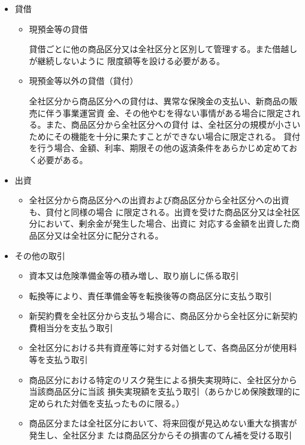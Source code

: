 \documentclass[report,gutter=10mm,fore-edge=10mm,uplatex,dvipdfmx]{jlreq}
\begin{document}
\begin{itemize}
\item[] 貸借
\begin{itemize}
\item[] 現預金等の貸借\par
貸借ごとに他の商品区分又は全社区分と区別して管理する。また借越しが継続しないように
限度額等を設ける必要がある。
\item[] 現預金等以外の貸借（貸付）\par
全社区分から商品区分への貸付は、異常な保険金の支払い、新商品の販売に伴う事業運営資
金、その他やむを得ない事情がある場合に限定される。また、商品区分から全社区分への貸付
は、全社区分の規模が小さいためにその機能を十分に果たすことができない場合に限定される。
貸付を行う場合、金額、利率、期限その他の返済条件をあらかじめ定めておく必要がある。
\end{itemize}
\item[] 出資
\begin{itemize}
\item[] 全社区分から商品区分への出資および商品区分から全社区分への出資も、貸付と同様の場合
 に限定される。出資を受けた商品区分又は全社区分において、剰余金が発生した場合、出資に
対応する金額を出資した商品区分又は全社区分に配分される。
\end{itemize}
\item[] その他の取引
\begin{itemize}
\item[] 資本又は危険準備金等の積み増し、取り崩しに係る取引
\item[] 転換等により、責任準備金等を転換後等の商品区分に支払う取引
\item[] 新契約費を全社区分から支払う場合に、商品区分から全社区分に新契約費相当分を支払う取引
\item[] 全社区分における共有資産等に対する対価として、各商品区分が使用料等を支払う取引
\item[] 商品区分における特定のリスク発生による損失実現時に、全社区分から当該商品区分に当該
損失実現額を支払う取引（あらかじめ保険数理的に定められた対価を支払ったものに限る。）
\item[] 商品区分または全社区分において、将来回復が見込めない重大な損害が発生し、全社区分ま
たは商品区分からその損害のてん補を受ける取引
\end{itemize}
\end{itemize}

\end{document}
